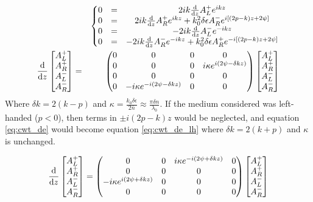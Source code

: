 \begin{eqnarray}
	&&\left\{
	\begin{matrix}
	0&=&2ik\dv{z}A_L^+ e^{ikz}\\
	0&=&2ik\dv{z}A_R^+ e^{ikz} + k_0^2\delta \epsilon A_R^- e^{i[(2p-k)z+2\psi]}\\
	0&=&-2ik\dv{z}A_L^- e^{-ikz}\\
	0&=&-2ik\dv{z}A_R^- e^{-ikz} + k_0^2\delta \epsilon A_R^+ e^{-i[(2p-k)z+2\psi]}\\
	\end{matrix}\right.\\
	\dv{z}\begin{bmatrix}
	A_L^+ \\
	A_R^+ \\
	A_L^- \\
	A_R^- \\
	\end{bmatrix} &=&
	\begin{pmatrix}
	0 & 0 & 0 & 0 \\
	0 & 0 & 0 & i\kappa e^{i(2\psi - \delta kz)} \\
	0 & 0 & 0 & 0 \\
	0 & -i\kappa e^{-i(2\psi - \delta kz)} & 0 & 0
	\end{pmatrix}
	\begin{bmatrix}
	A_L^+ \\
	A_R^+ \\
	A_L^- \\
	A_R^- \\
	\end{bmatrix}
	\label{eq:cwt_de}
\end{eqnarray}
Where $\delta k = 2(k-p)$ and $\kappa=\frac{k_0\delta\epsilon}{2\bar{n}}\approx\frac{\pi\delta n}{\lambda_0}$. 
If the medium considered was left-handed ($p<0$), then terms in $\pm i(2p-k)z$ would be neglected, and equation \ref{eq:cwt_de} would become equation \ref{eq:cwt_de_lh} where $\delta k = 2(k+p)$ and $\kappa$ is unchanged.

\begin{equation}
	\dv{z}\begin{bmatrix}
	A_L^+ \\
	A_R^+ \\
	A_L^- \\
	A_R^- \\
	\end{bmatrix} =
	\begin{pmatrix}
	0 & 0 & i\kappa e^{-i(2\psi + \delta kz)} & 0 \\
	0 & 0 & 0 & 0 \\
	-i\kappa e^{i(2\psi + \delta kz)}  & 0 & 0 & 0 \\
	0& 0 & 0 & 0
	\end{pmatrix}
	\begin{bmatrix}
	A_L^+ \\
	A_R^+ \\
	A_L^- \\
	A_R^- \\
	\end{bmatrix}
	\label{eq:cwt_de_lh}
\end{equation}

